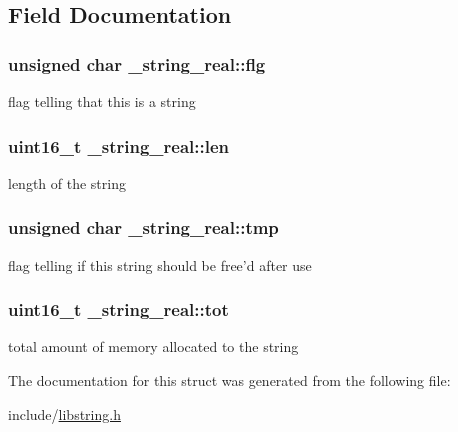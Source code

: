 \subsection{Field Documentation}
\hypertarget{struct__string__real_ac23d3f9fe5d59437dece0bc99488ef85}{
\subsubsection[{flg}]{\setlength{\rightskip}{0pt plus 5cm}unsigned char \-\_\-string\-\_\-real\-::flg}}\label{struct__string__real_ac23d3f9fe5d59437dece0bc99488ef85}
flag telling that this is a string \hypertarget{struct__string__real_a4c51041b496d561d8ea8c8af4aa34ea5}{
\subsubsection[{len}]{\setlength{\rightskip}{0pt plus 5cm}uint16\-\_\-t \-\_\-string\-\_\-real\-::len}}\label{struct__string__real_a4c51041b496d561d8ea8c8af4aa34ea5}
length of the string \hypertarget{struct__string__real_a205f432017baaaf2b429a5c835510152}{
\subsubsection[{tmp}]{\setlength{\rightskip}{0pt plus 5cm}unsigned char \-\_\-string\-\_\-real\-::tmp}}\label{struct__string__real_a205f432017baaaf2b429a5c835510152}
flag telling if this string should be free'd after use \hypertarget{struct__string__real_a0a2aeea98f557b0e98e15aa42414e855}{
\subsubsection[{tot}]{\setlength{\rightskip}{0pt plus 5cm}uint16\-\_\-t \-\_\-string\-\_\-real\-::tot}}\label{struct__string__real_a0a2aeea98f557b0e98e15aa42414e855}
total amount of memory allocated to the string 

The documentation for this struct was generated from the following file\-:\begin{DoxyCompactItemize}
\item 
include/\hyperlink{libstring_8h}{libstring.\-h}\end{DoxyCompactItemize}
